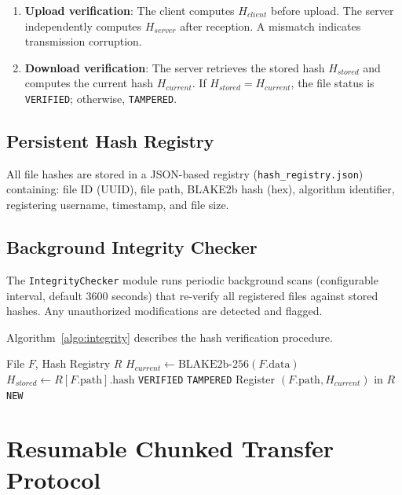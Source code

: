 \begin{enumerate}
    \item \textbf{Upload verification}: The client computes $H_{client}$ before upload. The server independently computes $H_{server}$ after reception. A mismatch indicates transmission corruption.
    \item \textbf{Download verification}: The server retrieves the stored hash $H_{stored}$ and computes the current hash $H_{current}$. If $H_{stored} = H_{current}$, the file status is \texttt{VERIFIED}; otherwise, \texttt{TAMPERED}.
\end{enumerate}

\subsection{Persistent Hash Registry}

All file hashes are stored in a JSON-based registry (\texttt{hash\_registry.json}) containing: file ID (UUID), file path, BLAKE2b hash (hex), algorithm identifier, registering username, timestamp, and file size.

\subsection{Background Integrity Checker}

The \texttt{IntegrityChecker} module runs periodic background scans (configurable interval, default 3600 seconds) that re-verify all registered files against stored hashes. Any unauthorized modifications are detected and flagged.

Algorithm~\ref{algo:integrity} describes the hash verification procedure.

\begin{algorithm}[H]
\caption{BLAKE2b File Integrity Verification}
\label{algo:integrity}
\begin{algorithmic}[1]
\Require File $F$, Hash Registry $R$
\State $H_{current} \gets \text{BLAKE2b-256}(F.\text{data})$
    \State $H_{stored} \gets R[F.\text{path}].\text{hash}$
        \State \Return \texttt{VERIFIED}
    \Else
        \State \Return \texttt{TAMPERED}
    \EndIf
\Else
    \State Register $(F.\text{path}, H_{current})$ in $R$
    \State \Return \texttt{NEW}
\EndIf
\end{algorithmic}
\end{algorithm}

\section{Resumable Chunked Transfer Protocol}

